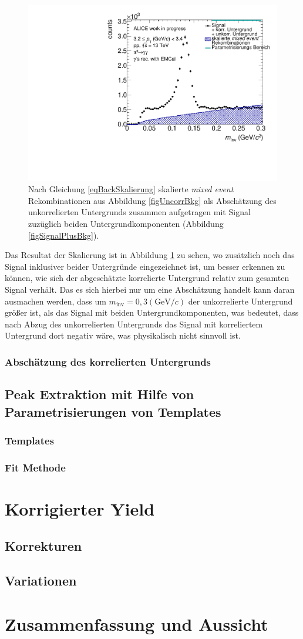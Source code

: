 \documentclass[11pt]{article}
\begin{document}
	\begin{figure}[tbp]
		\centering
		\includegraphics[width=.7\linewidth]{hUncorrBkgNorm.pdf}
		\caption{Nach Gleichung \ref{eqBackSkalierung} skalierte {\it mixed event} Rekombinationen aus Abbildung \ref{figUncorrBkg} als Absch{\"a}tzung des unkorrelierten Untergrunds zusammen aufgetragen mit Signal zuz{\"u}glich beiden Untergrundkomponenten (Abbildung \ref{figSignalPlusBkg}).}
		\label{figUncorrBkgNorm}
	\end{figure}
	Das Resultat der Skalierung ist in Abbildung \ref{figUncorrBkgNorm} zu sehen, wo zus{\"a}tzlich noch das Signal inklusiver beider Untergr{\"u}nde eingezeichnet ist, um besser erkennen zu k{\"o}nnen, wie sich der abgesch{\"a}tzte korrelierte Untergrund relativ zum gesamten Signal verh{\"a}lt.
	Das es sich hierbei nur um eine Absch{\"a}tzung handelt kann daran ausmachen werden, dass um $m_{\text{inv}} = 0,3 (\text{GeV/}c)$ der unkorrelierte Untergrund gr{\"o}{\ss}er ist, als das Signal mit beiden Untergrundkomponenten, was bedeutet, dass nach Abzug des unkorrelierten Untergrunds das Signal mit korreliertem Untergrund dort negativ w{\"a}re, was physikalisch nicht sinnvoll ist.
	\subsubsection{Absch{\"a}tzung des korrelierten Untergrunds}
	\subsection{Peak Extraktion mit Hilfe von Parametrisierungen von Templates}
	\subsubsection{Templates}
	\subsubsection{Fit Methode}
	\section{Korrigierter Yield}
	\subsection{Korrekturen}
	\subsection{Variationen}
	\section{Zusammenfassung und Aussicht}
\end{document}
